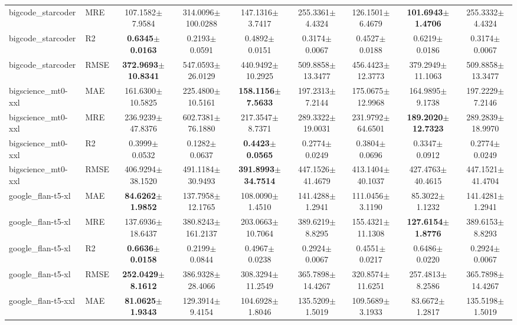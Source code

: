 \begin{table}[t]
\begin{tabular}{llccccccc}
bigcode\_starcoder & MRE & 107.1582$\pm$7.9584 & 314.0096$\pm$100.0288 & 147.1316$\pm$3.7417 & 255.3361$\pm$4.4324 & 126.1501$\pm$6.4679 & \textbf{101.6943$\pm$1.4706} & 255.3332$\pm$4.4324 \\
bigcode\_starcoder & R2 & \textbf{0.6345$\pm$0.0163} & 0.2193$\pm$0.0591 & 0.4892$\pm$0.0151 & 0.3174$\pm$0.0067 & 0.4527$\pm$0.0188 & 0.6219$\pm$0.0186 & 0.3174$\pm$0.0067 \\
bigcode\_starcoder & RMSE & \textbf{372.9693$\pm$10.8341} & 547.0593$\pm$26.0129 & 440.9492$\pm$10.2925 & 509.8858$\pm$13.3477 & 456.4423$\pm$12.3773 & 379.2949$\pm$11.1063 & 509.8858$\pm$13.3477 \\
\addlinespace
bigscience\_mt0-xxl & MAE & 161.6300$\pm$10.5825 & 225.4800$\pm$10.5161 & \textbf{158.1156$\pm$7.5633} & 197.2313$\pm$7.2144 & 175.0675$\pm$12.9968 & 164.9895$\pm$9.1738 & 197.2229$\pm$7.2146 \\
bigscience\_mt0-xxl & MRE & 236.9239$\pm$47.8376 & 602.7381$\pm$76.1880 & 217.3547$\pm$8.7371 & 289.3322$\pm$19.0031 & 231.9792$\pm$64.6501 & \textbf{189.2020$\pm$12.7323} & 289.2839$\pm$18.9970 \\
bigscience\_mt0-xxl & R2 & 0.3999$\pm$0.0532 & 0.1282$\pm$0.0637 & \textbf{0.4423$\pm$0.0565} & 0.2774$\pm$0.0249 & 0.3804$\pm$0.0696 & 0.3347$\pm$0.0912 & 0.2774$\pm$0.0249 \\
bigscience\_mt0-xxl & RMSE & 406.9294$\pm$38.1520 & 491.1184$\pm$30.9493 & \textbf{391.8993$\pm$34.7514} & 447.1526$\pm$41.4679 & 413.1404$\pm$40.1037 & 427.4763$\pm$40.4615 & 447.1521$\pm$41.4704 \\
\addlinespace
google\_flan-t5-xl & MAE & \textbf{84.6262$\pm$1.9852} & 137.7958$\pm$12.1765 & 108.0090$\pm$1.4510 & 141.4288$\pm$1.2941 & 111.0456$\pm$3.1190 & 85.3022$\pm$1.1232 & 141.4281$\pm$1.2941 \\
google\_flan-t5-xl & MRE & 137.6936$\pm$18.6437 & 380.8243$\pm$161.2137 & 203.0663$\pm$10.7064 & 389.6219$\pm$8.8295 & 155.4321$\pm$11.1308 & \textbf{127.6154$\pm$1.8776} & 389.6153$\pm$8.8293 \\
google\_flan-t5-xl & R2 & \textbf{0.6636$\pm$0.0158} & 0.2199$\pm$0.0844 & 0.4967$\pm$0.0238 & 0.2924$\pm$0.0067 & 0.4551$\pm$0.0217 & 0.6486$\pm$0.0220 & 0.2924$\pm$0.0067 \\
google\_flan-t5-xl & RMSE & \textbf{252.0429$\pm$8.1612} & 386.9328$\pm$28.4066 & 308.3294$\pm$11.2549 & 365.7898$\pm$14.4267 & 320.8574$\pm$11.6251 & 257.4813$\pm$8.2586 & 365.7898$\pm$14.4267 \\
\addlinespace
google\_flan-t5-xxl & MAE & \textbf{81.0625$\pm$1.9343} & 129.3914$\pm$9.4154 & 104.6928$\pm$1.8046 & 135.5209$\pm$1.5019 & 109.5689$\pm$3.1933 & 83.6672$\pm$1.2817 & 135.5198$\pm$1.5019 \\

\end{tabular}
\end{table}
